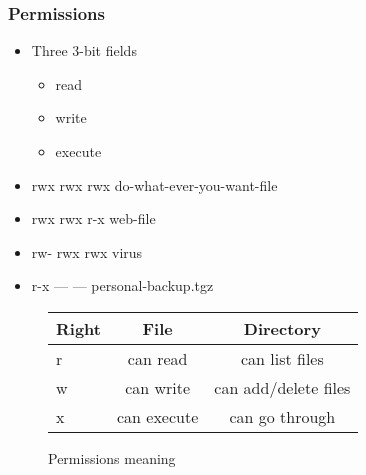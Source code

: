   \begin{frame}
    \frametitle{Permissions} 
      \begin{itemize}
        \item Three 3-bit fields
          \begin{itemize}
            \item r{\color{gray}ead}
            \item w{\color{gray}rite}
            \item {\color{gray}e}x{\color{gray}ecute}
          \end{itemize}
        \item {\color{OliveGreen}rwx} {\color{Marroon}rwx} {\color{fuchsia}rwx} do-what-ever-you-want-file
        \item {\color{OliveGreen}rwx} {\color{Marroon}rwx} {\color{fuchsia}r-x} web-file
        \item {\color{OliveGreen}rw-} {\color{Marroon}rwx} {\color{fuchsia}rwx} virus
        \item {\color{OliveGreen}r-x} {\color{Marroon}---} {\color{fuchsia}---} personal-backup.tgz
      \end{itemize}
    \begin{figure}
      \centering
      \begin{tabular}{l|c|c}
        Right  & File  & Directory \\ \hline
        r & can read   & can list files \\ \hline
        w & can write  & can add/delete files \\ \hline
        x & can execute& can go through \\ \hline
      \end{tabular}
      \caption{Permissions meaning}
      \label{fig:tab-right}
    \end{figure}

  \end{frame}
